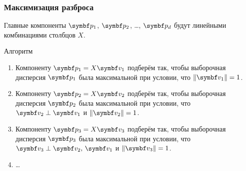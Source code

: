 \begin{frame}
  \frametitle{Максимизация разброса}

  Главные компоненты $\bp_1$, $\bp_2$, \ldots, $\bp_d$ будут линейными 
  комбинациями столбцов $X$. \pause

  \begin{block}{Алгоритм}
    \begin{enumerate}
      \item Компоненту $\bp_1 = X \bv_1$ подберём так, чтобы 
      выборочная дисперсия $\bp_1$ была максимальной при условии, что $\norm{\bv_1}=1$. \pause
    \item Компоненту $\bp_2 = X \bv_2$ подберём так, чтобы 
    выборочная дисперсия $\bp_2$ была максимальной при условии, что $\bv_2 \perp \bv_1$ и $\norm{\bv_2}=1$. \pause
  \item Компоненту $\bp_3 = X \bv_3$ подберём так, чтобы 
  выборочная дисперсия $\bp_3$ была максимальной при условии, что $\bv_3 \perp \bv_2,\, \bv_1$ и $\norm{\bv_3}=1$. 
      \item \ldots
    \end{enumerate}
    
  \end{block}
  

\end{frame}


